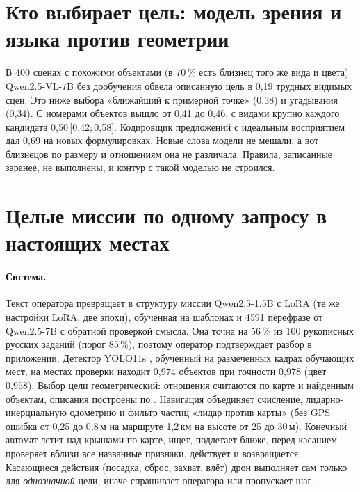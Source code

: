 \documentclass[10pt]{article}
\newcommand{\ci}[2]{\,[#1;\,#2]}
\begin{document}
\section{Кто выбирает цель: модель зрения и языка против геометрии}\label{sec:vlm}
В 400 сценах с похожими объектами (в 70\,\% есть близнец того же вида и цвета) Qwen2.5-VL-7B \citep{qwen25vl} без дообучения
обвела описанную цель в 0,19 трудных видимых сцен. Это ниже выбора «ближайший к примерной точке» (0,38) и угадывания (0,34). С
номерами объектов \citep{yang2023som} вышло от 0,41 до 0,46, с видами крупно каждого кандидата 0,50\ci{0{,}42}{0{,}58}. Кодировщик предложений с идеальным
восприятием дал 0,69 на новых формулировках. Новые слова модели не мешали, а вот близнецов по размеру и отношениям она не
различала. Правила, записанные заранее, не выполнены, и контур с такой моделью не строился.

\section{Целые миссии по одному запросу в настоящих местах}\label{sec:missions}
\paragraph{Система.} Текст оператора превращает в структуру миссии Qwen2.5-1.5B с LoRA (те же настройки LoRA, две эпохи), обученная на шаблонах и 4591 перефразе от
Qwen2.5-7B с обратной проверкой смысла. Она точна на 56\,\% из 100 рукописных русских заданий (порог 85\,\%), поэтому оператор
подтверждает разбор в приложении. Детектор YOLO11s \citep{yolo11}, обученный на размеченных кадрах обучающих мест, на местах
проверки находит 0,974 объектов при точности 0,978 (цвет 0,958). Выбор цели геометрический: отношения считаются по карте и
найденным объектам, описания построены по \citet{dale1995}. Навигация объединяет счисление, лидарно-инерциальную одометрию и
фильтр частиц «лидар против карты» (без GPS ошибка от 0,25 до 0,8\,м на маршруте 1,2\,км на высоте от 25 до 30\,м). Конечный автомат
летит над крышами по карте, ищет, подлетает ближе, перед касанием проверяет вблизи все названные признаки, действует и
возвращается. Касающиеся действия (посадка, сброс, захват, влёт) дрон выполняет сам только для \emph{однозначной} цели, иначе
спрашивает оператора или пропускает шаг.
\end{document}
